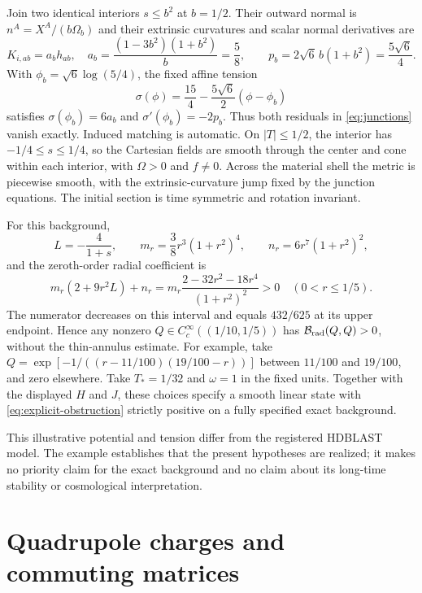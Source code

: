 \documentclass[11pt]{article}
\theoremstyle{remark}
\begin{document}
Join two identical interiors $s\le b^2$ at $b=1/2$.
Their outward normal is $n^A=X^A/(b\Omega_b)$ and their extrinsic
curvatures and scalar normal derivatives are
\begin{equation}
 K_{i,ab}=a_bh_{ab},\quad
 a_b=\frac{(1-3b^2)(1+b^2)}{b}=\frac58,\qquad
 p_b=2\sqrt6\,b(1+b^2)=\frac{5\sqrt6}{4}.
\end{equation}
With $\phi_b=\sqrt6\log(5/4)$, the fixed affine tension
\begin{equation}
 \sigma(\phi)=\frac{15}{4}-\frac{5\sqrt6}{2}(\phi-\phi_b)
 \label{eq:explicit-tension}
\end{equation}
satisfies $\sigma(\phi_b)=6a_b$ and $\sigma'(\phi_b)=-2p_b$.
Thus both residuals in \eqref{eq:junctions} vanish exactly. Induced
matching is automatic. On $|T|\le1/2$, the interior has
$-1/4\le s\le1/4$, so the Cartesian fields are smooth through the center
and cone within each interior, with $\Omega>0$ and $f\ne0$.
Across the material shell the metric is piecewise smooth, with the
extrinsic-curvature jump fixed by the junction equations. The initial section is time
symmetric and rotation invariant.

For this background,
\begin{equation}
 L=-\frac4{1+s},\qquad m_r=\frac38r^3(1+r^2)^4,\qquad
 n_r=6r^7(1+r^2)^2,
\end{equation}
and the zeroth-order radial coefficient is
\begin{equation}
 m_r(2+9r^2L)+n_r
 =m_r\frac{2-32r^2-18r^4}{(1+r^2)^2}>0
 \quad(0<r\le1/5).
 \label{eq:explicit-positive}
\end{equation}
The numerator decreases on this interval and equals $432/625$ at its
upper endpoint. Hence any nonzero $Q\in C_c^\infty((1/10,1/5))$ has
$\mathcal B_{\rm rad}(Q,Q)>0$, without the thin-annulus estimate.
For example, take $Q=\exp[-1/((r-11/100)(19/100-r))]$ between
$11/100$ and $19/100$, and zero elsewhere. Take $T_*=1/32$ and
$\omega=1$ in the fixed units. Together with the displayed $H$ and $J$,
these choices specify a smooth linear state with
\eqref{eq:explicit-obstruction} strictly positive on a fully specified
exact background.

This illustrative potential and tension differ from the registered
HDBLAST model. The example establishes that the present hypotheses are
realized; it makes no priority claim for the exact background and no
claim about its long-time stability or cosmological interpretation.

\section{Quadrupole charges and commuting matrices}
\label{sec:quadrupoles}
\end{document}
